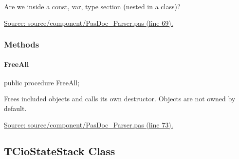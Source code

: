 \documentclass{report}
\newif\ifpdf
\begin{document}
\begin{list}{}
\begin{flushleft}
\ifpdf
\end{flushleft}
\fi


\par Are we inside a const, var, type section (nested in a class)?\par
\href{https://github.com/pasdoc/pasdoc/blob/master/source/component/PasDoc_Parser.pas#L69}{Source: source/component/PasDoc{\_}Parser.pas (line 69).}\end{list}
\subsubsection*{\large{\textbf{Methods}}\normalsize\hspace{1ex}\hfill}
\paragraph*{FreeAll}\hspace*{\fill}

\label{PasDoc_Parser.TCioState-FreeAll}
\begin{list}{}{
\setlength{\itemindent}{0cm}
\setlength{\listparindent}{0cm}
\setlength{\leftmargin}{\evensidemargin}
\addtolength{\leftmargin}{\tmplength}
\settowidth{\labelsep}{X}
\addtolength{\leftmargin}{\labelsep}
\setlength{\labelwidth}{\tmplength}
}
\item[\textbf{Declaration}\hfill]
\ifpdf
\begin{flushleft}
\fi
\begin{ttfamily}
public procedure FreeAll;\end{ttfamily}

\ifpdf
\end{flushleft}
\fi

\par
\item[\textbf{Description}]
Frees included objects and calls its own destructor. Objects are not owned by default.\par
\href{https://github.com/pasdoc/pasdoc/blob/master/source/component/PasDoc_Parser.pas#L73}{Source: source/component/PasDoc{\_}Parser.pas (line 73).}

\end{list}
\ifpdf
\subsection*{\large{\textbf{TCioStateStack Class}}\normalsize\hspace{1ex}\hrulefill}
\else
\end{document}
